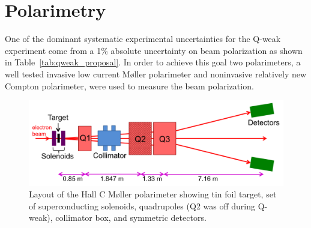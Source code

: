 \section{Polarimetry}%
\label{Polarimetry}

One of the dominant systematic experimental uncertainties for the Q-weak experiment come from 
a 1\% absolute uncertainty on beam polarization as shown in Table~\ref{tab:qweak_proposal}. In order to achieve this goal two polarimeters, a well tested invasive low current M{\o}ller polarimeter and noninvasive relatively new Compton polarimeter, were used to measure the beam polarization.

\begin{singlespace}
\begin{figure}[!h]
	\begin{center}
	\includegraphics[width=15cm]{figures/moller}
	\caption
	{Layout of the Hall C M{\o}ller polarimeter showing tin foil target, set of superconducting solenoids, quadrupoles (Q2 was off during Q-weak), collimator box, and symmetric detectors.}
	\label{fig:moller}
	\end{center}
\end{figure}
\end{singlespace}

